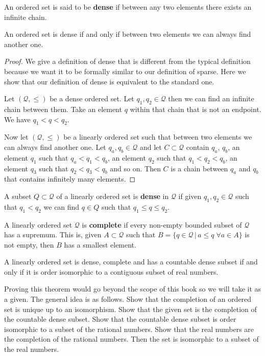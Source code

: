 \documentclass[11pt,letterpaper,fleqn]{memoir} %
\begin{document}
\begin{mathSection}
\begin{defn}
	An ordered set is said to be \textbf{dense} if between any two elements there exists an infinite chain.
\end{defn}
\begin{coro}
	An ordered set is dense if and only if between two elements we can always find another one.
\end{coro}
\begin{proof}
	We give a definition of dense that is different from the typical definition because we want it to be formally similar to our definition of sparse. Here we show that our definition of dense is equivalent to the standard one.
	
	Let $(\mathcal{Q}, \leq)$ be a dense ordered set. Let $q_1, q_2 \in \mathcal{Q}$ then we can find an infinite chain between them. Take an element $q$ within that chain that is not an endpoint. We have $q_1 < q < q_2$.
	
	Now let $(\mathcal{Q}, \leq)$ be a linearly ordered set such that between two elements we can always find another one.  Let $q_a, q_b \in \mathcal{Q}$ and let $C \subset \mathcal{Q}$ contain $q_a$, $q_b$, an element $q_1$ such that $q_a < q_1 < q_b$, an element $q_2$ such that $q_1 < q_2 < q_b$, an element $q_3$ such that $q_2 < q_3 < q_b$ and so on. Then $C$ is a chain between $q_a$ and $q_b$ that contains infinitely many elements.
\end{proof}
\begin{defn}
	A subset $Q \subset \mathcal{Q}$ of a linearly ordered set is \textbf{dense} in $\mathcal{Q}$ if given $q_1, q_2 \in \mathcal{Q}$ such that $q_1 < q_2$ we can find $q \in Q$ such that $q_1 \leq q \leq q_2$.
\end{defn}
\begin{defn}
	A linearly ordered set $\mathcal{Q}$ is \textbf{complete} if every non-empty bounded subset of $\mathcal{Q}$ has a supremum. This is, given $A \subset \mathcal{Q}$ such that $B = \{ q \in \mathcal{Q} \, | \, a \leq q \; \forall a \in A \}$ is not empty, then $B$ has a smallest element.
\end{defn}
\begin{thrm}\label{3_thrm_real_ordering}
	A linearly ordered set is dense, complete and has a countable dense subset if and only if it is order isomorphic to a contiguous subset of real numbers.
\end{thrm}
\begin{remark}
	Proving this theorem would go beyond the scope of this book so we will take it as a given. The general idea is as follows. Show that the completion of an ordered set is unique up to an isomorphism. Show that the given set is the completion of the countable dense subset. Show that the countable dense subset is order isomorphic to a subset of the rational numbers. Show that the real numbers are the completion of the rational numbers. Then the set is isomorphic to a subset of the real numbers.
\end{remark}
\end{mathSection}
\end{document}
